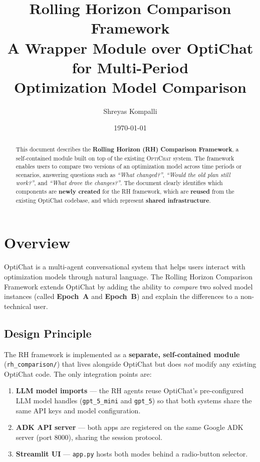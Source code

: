 \documentclass[11pt, a4paper]{article}
\title{%
    \textbf{Rolling Horizon Comparison Framework} \\[6pt]
    \large A Wrapper Module over OptiChat for Multi-Period \\
    Optimization Model Comparison
}
\author{Shreyas Kompalli}
\date{\today}
\begin{document}
\maketitle

\begin{abstract}
This document describes the \textbf{Rolling Horizon (RH) Comparison Framework},
a self-contained module built on top of the existing \textsc{OptiChat} system.
The framework enables users to compare two versions of an optimization model
across time periods or scenarios, answering questions such as \emph{``What
changed?''}, \emph{``Would the old plan still work?''}, and \emph{``What drove
the changes?''}.  The document clearly identifies which components are
\textcolor{newcode}{\textbf{newly created}} for the RH framework, which are
\textcolor{reused}{\textbf{reused}} from the existing OptiChat codebase, and
which represent \textcolor{shared}{\textbf{shared infrastructure}}.
\end{abstract}

\tableofcontents
\newpage

\section{Overview}

OptiChat is a multi-agent conversational system that helps users interact with
optimization models through natural language.  The Rolling Horizon Comparison
Framework extends OptiChat by adding the ability to \emph{compare} two solved
model instances (called \textbf{Epoch~A} and \textbf{Epoch~B}) and explain the
differences to a non-technical user.

\subsection{Design Principle}

The RH framework is implemented as a \textbf{separate, self-contained module}
(\texttt{rh\_comparison/}) that lives alongside OptiChat but does \emph{not}
modify any existing OptiChat code.  The only integration points are:

\begin{enumerate}[leftmargin=2em]
    \item \textbf{LLM model imports} --- the RH agents reuse OptiChat's
          pre-configured LLM model handles (\texttt{gpt\_5\_mini} and
          \texttt{gpt\_5}) so that both systems share the same API keys and
          model configuration.
    \item \textbf{ADK API server} --- both apps are registered on the same
          Google ADK server (port 8000), sharing the session protocol.
    \item \textbf{Streamlit UI} --- \texttt{app.py} hosts both modes behind a
          radio-button selector.
\end{enumerate}
\end{document}
